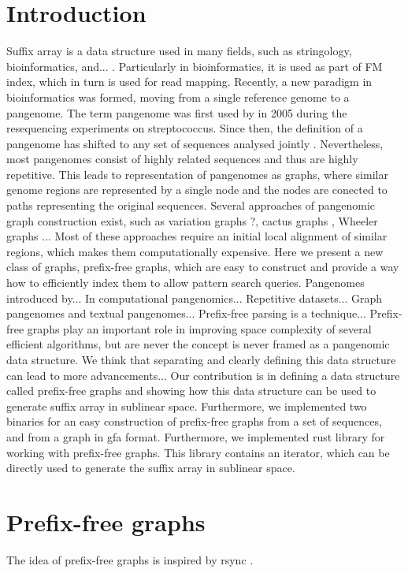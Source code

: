 \documentclass[twocolumn]{ceurart}
\begin{document}
\section{Introduction}
Suffix array is a data structure used in many fields, such as stringology,
bioinformatics, and... .
Particularly in bioinformatics, it is used as part of FM index, which in turn
is used for read mapping.
Recently, a new paradigm in bioinformatics was formed, moving from a single
reference genome to a pangenome.
The term pangenome was first used by \citet{tettelin2005genome} in 2005 during the
resequencing experiments on streptococcus.
Since then, the definition of a pangenome has shifted to any set of sequences
analysed jointly \cite{computational2018computational}.
Nevertheless, most pangenomes consist of highly related sequences and thus are
highly repetitive.
This leads to representation of pangenomes as graphs, where similar genome
regions are represented by a single node and the nodes are conected to paths
representing the original sequences.
Several approaches of pangenomic graph construction exist, such as variation
graphs \cite{church2015extending}?, cactus graphs \cite{paten2011cactus}, 
Wheeler graphs \cite{gagie2017wheeler} ...
Most of these approaches require an initial local alignment of similar regions,
which makes them computationally expensive.
Here we present a new class of graphs, prefix-free graphs, which are easy to
construct and provide a way how to efficiently index them to allow pattern 
search queries.
Pangenomes introduced by...
In computational pangenomics...
Repetitive datasets...
Graph pangenomes and textual pangenomes...
Prefix-free parsing is a technique...
Prefix-free graphs play an important role in improving space
complexity of several efficient algorithms, but are never the concept is never
framed as a pangenomic data structure.
We think that separating and clearly defining this data structure can lead to
more advancements...
Our contribution is in defining a data structure called prefix-free graphs and
showing how this data structure can be used to generate suffix array in
sublinear space.
Furthermore, we implemented two binaries for an easy construction of prefix-free
graphs from a set of sequences, and from a graph in gfa format.
Furthermore, we implemented rust library for working with prefix-free graphs.
This library contains an iterator, which can be directly used to generate the 
suffix array in sublinear space.

\section{Prefix-free graphs}
The idea of prefix-free graphs is inspired by rsync \cite{kornblum2006identifying}.
\end{document}
